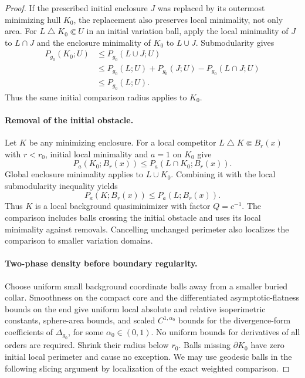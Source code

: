 \begin{proof}
If the prescribed initial enclosure $J$ was replaced by its
outermost minimizing hull $K_0$, the replacement also preserves
local minimality, not only area. For
$L\mathbin{\triangle}K_0\Subset U$ in an initial variation ball,
apply the local minimality of $J$ to $L\cap J$ and the enclosure
minimality of $K_0$ to $L\cup J$. Submodularity gives
\[
 \begin{aligned}
 P_{g_0}(K_0;U)
 &\le P_{g_0}(L\cup J;U)\\
 &\le P_{g_0}(L;U)+P_{g_0}(J;U)-P_{g_0}(L\cap J;U)\\
 &\le P_{g_0}(L;U).
 \end{aligned}
\]
Thus the same initial comparison radius applies to $K_0$.

\paragraph{Removal of the initial obstacle.}
Let $K$ be any minimizing enclosure. For a local competitor
$L\mathbin{\triangle}K\Subset B_r(x)$ with $r<r_0$, initial
local minimality and $a=1$ on $K_0$ give
\[
 P_a(K_0;B_r(x))
 \le P_a(L\cap K_0;B_r(x)).
\]
Global enclosure minimality applies to $L\cup K_0$.
Combining it with the local submodularity inequality yields
\begin{equation}
\label{eq:rpi:flow-local-weighted-minimality}
 P_a(K;B_r(x))
 \le P_a(L;B_r(x)).
\end{equation}
Thus $K$ is a local background quasiminimizer with factor $Q=c^{-1}$.
The comparison includes balls crossing the initial obstacle and uses
its local minimality against removals. Cancelling unchanged perimeter
also localizes the comparison to smaller variation domains.

\paragraph{Two-phase density before boundary regularity.}
Choose uniform small background coordinate balls away from a
smaller buried collar. Smoothness on the compact core and the
differentiated asymptotic-flatness bounds on the end give uniform
local absolute and relative isoperimetric constants, sphere-area
bounds, and scaled $C^{1,\alpha_0}$ bounds for the divergence-form
coefficients of $\Delta_{g_0}$, for some $\alpha_0\in(0,1)$.
No uniform bounds for derivatives of all orders are required.
Shrink their
radius below $r_0$. Balls missing
$\partial K_0$ have zero initial local perimeter and cause no
exception. We may use geodesic balls in the following slicing
argument by localization of the exact weighted comparison.


\end{proof}
